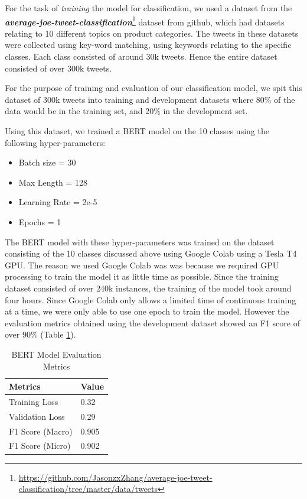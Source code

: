 \documentclass[parskip=full, 11pt]{article}
\begin{document}
For the task of \emph{training} the model for classification, we used a dataset from the \textbf{{\emph{average-joe-tweet-classification}}}\footnote{\url{https://github.com/JasonzxZhang/average-joe-tweet-classification/tree/master/data/tweets}} dataset from github, which had datasets relating to 10 different topics on product categories. The tweets in these datasets were collected using key-word matching, using keywords relating to the specific classes. Each class consisted of around 30k tweets. Hence the entire dataset consisted of over 300k tweets. 


For the purpose of training and evaluation of our classification model, we spit this dataset of 300k tweets into training and development datasets where 80\% of the data would be in the training set, and 20\% in the development set. 


Using this dataset, we trained a BERT model \citep{devlin-etal-2019-bert} on the 10 classes using the following hyper-parameters:

\begin{itemize}
    \item Batch size = 30
    \item Max Length = 128
    \item Learning Rate = 2e-5
    \item Epochs = 1
\end{itemize}

The BERT model with these hyper-parameters was trained on the dataset consisting of the 10 classes discussed above using Google Colab using a Tesla T4 GPU. The reason we used Google Colab was was because we required GPU processing to train the model it as little time as possible. Since the training dataset consisted of over 240k instances, the training of the model took around four hours. Since Google Colab only allows a limited time of continuous training at a time, we were only able to use one epoch to train the model. However the evaluation metrics obtained using the development dataset showed an F1 score of over 90\% (Table \ref{table:bert_eval_metrics}).

\begin{table}[H]
    \centering
    \begin{tabular}{ p{3cm} p{2cm} }
    \toprule
        \textbf{Metrics} & \textbf{Value} \\
        \midrule
        Training Loss & 0.32 \\
        Validation Loss & 0.29 \\
        F1 Score (Macro) & 0.905 \\
        F1 Score (Micro) & 0.902 \\
    \bottomrule
    \end{tabular}
    \caption{BERT Model Evaluation Metrics}
    \label{table:bert_eval_metrics}
\end{table}
\end{document}
